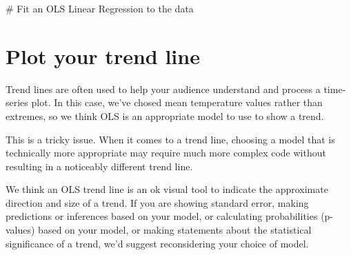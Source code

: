 \documentclass[
  letterpaper,
  DIV=11,
  numbers=noendperiod,
  oneside]{scrreprt}
\newenvironment{Shaded}{\begin{snugshade}}{\end{snugshade}}
\newcommand{\CommentTok}[1]{\textcolor[rgb]{0.37,0.37,0.37}{#1}}
\begin{document}
\begin{Shaded}
\begin{Highlighting}[]
\CommentTok{\# Fit an OLS Linear Regression to the data}
\end{Highlighting}
\end{Shaded}

\section{Plot your trend line}\label{plot-your-trend-line}

Trend lines are often used to help your audience understand and process
a time-series plot. In this case, we've chosed mean temperature values
rather than extremes, so we think OLS is an appropriate model to use to
show a trend.

\begin{tcolorbox}[enhanced jigsaw, colbacktitle=quarto-callout-important-color!10!white, opacityback=0, bottomtitle=1mm, toptitle=1mm, bottomrule=.15mm, left=2mm, colframe=quarto-callout-important-color-frame, leftrule=.75mm, opacitybacktitle=0.6, colback=white, rightrule=.15mm, toprule=.15mm, breakable, titlerule=0mm, title=\textcolor{quarto-callout-important-color}{\faExclamation}\hspace{0.5em}{Is it ok to plot a trend line even if OLS isn't an appropriate model?}, coltitle=black, arc=.35mm]

This is a tricky issue. When it comes to a trend line, choosing a model
that is technically more appropriate may require much more complex code
without resulting in a noticeably different trend line.

We think an OLS trend line is an ok visual tool to indicate the
approximate direction and size of a trend. If you are showing standard
error, making predictions or inferences based on your model, or
calculating probabilities (p-values) based on your model, or making
statements about the statistical significance of a trend, we'd suggest
reconsidering your choice of model.

\end{tcolorbox}
\end{document}
